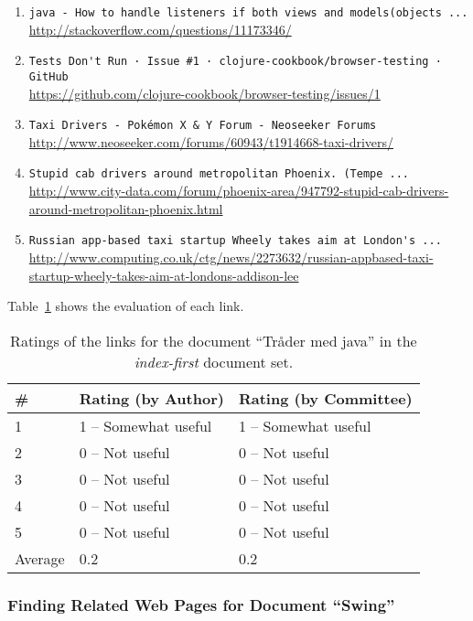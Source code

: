\begin{enumerate}
\item
    \verb|java - How to handle listeners if both views and models(objects ...| \\
    \url{http://stackoverflow.com/questions/11173346/}
\item
    \verb|Tests Don't Run · Issue #1 · clojure-cookbook/browser-testing · GitHub| \\
    \url{https://github.com/clojure-cookbook/browser-testing/issues/1}
\item
    \verb|Taxi Drivers - Pokémon X & Y Forum - Neoseeker Forums| \\
    \url{http://www.neoseeker.com/forums/60943/t1914668-taxi-drivers/}
\item
    \verb|Stupid cab drivers around metropolitan Phoenix. (Tempe ...| \\
    \url{http://www.city-data.com/forum/phoenix-area/947792-stupid-cab-drivers-around-metropolitan-phoenix.html}
\item
    \verb|Russian app-based taxi startup Wheely takes aim at London's ...| \\
    \url{http://www.computing.co.uk/ctg/news/2273632/russian-appbased-taxi-startup-wheely-takes-aim-at-londons-addison-lee}
\end{enumerate}

Table~\ref{tab:ratings-no-tr-der-med-java-2} shows the evaluation of each link.
\begin{table}[H]
\centering
\begin{tabular}{|l|l|l|}
\hline\hline
    \# & Rating (by Author) & Rating (by Committee) \\
\hline
    1 & 1 -- Somewhat useful & 1 -- Somewhat useful \\
    2 & 0 -- Not useful & 0 -- Not useful \\
    3 & 0 -- Not useful & 0 -- Not useful \\
    4 & 0 -- Not useful & 0 -- Not useful \\
    5 & 0 -- Not useful & 0 -- Not useful \\
\hline
    Average & 0.2 & 0.2 \\
\hline\hline
\end{tabular}
\caption{Ratings of the links for the document ``Tråder med java'' in the \textit{index-first} document set.}
\label{tab:ratings-no-tr-der-med-java-2}
\end{table}


\subsubsection{Finding Related Web Pages for Document ``Swing''}
\label{subsubsec:no-swing-2}

